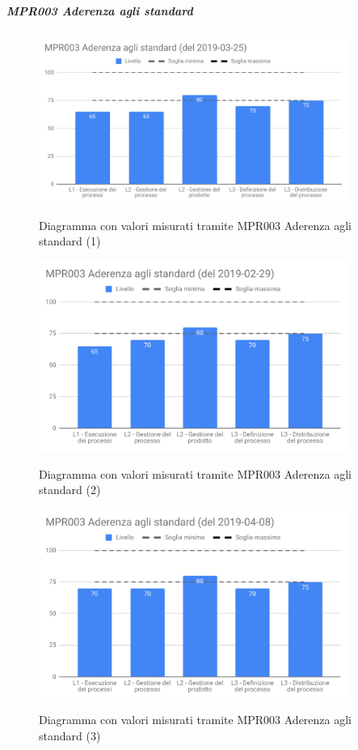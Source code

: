 	\subparagraph{MPR003 Aderenza agli standard}
	
	\begin{figure}[H]
		\centering
		\includegraphics[width=0.9\textwidth]{img/cruscotti/RQ/MPR003(1).png}
		\label{immagineAderenzaStandard1RQ}
		\caption{Diagramma con valori misurati tramite MPR003 Aderenza agli standard (1)}
	\end{figure}
	
	\begin{figure}[H]
		\centering
		\includegraphics[width=0.9\textwidth]{img/cruscotti/RQ/MPR003(2).png}
		\label{immagineAderenzaStandard2RQ}
		\caption{Diagramma con valori misurati tramite MPR003 Aderenza agli standard (2)}
	\end{figure}
	
	\begin{figure}[H]
		\centering
		\includegraphics[width=0.9\textwidth]{img/cruscotti/RQ/MPR003(3).png}
		\label{immagineAderenzaStandard3RQ}
		\caption{Diagramma con valori misurati tramite MPR003 Aderenza agli standard (3)}
	\end{figure}
	

